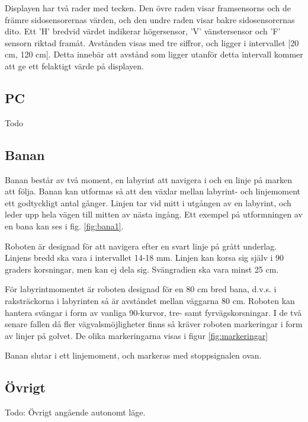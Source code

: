 
Displayen har två rader med tecken. Den övre raden visar framsensorns och de främre sidosensorernas värden, och den undre raden visar bakre sidosensorernas dito. Ett 'H' bredvid värdet indikerar högersensor, 'V' vänstersensor och 'F' sensorn riktad framåt. Avstånden visas med tre siffror, och ligger i intervallet [20 cm, 120 cm]. Detta innebär att avstånd som ligger utanför detta intervall kommer att ge ett felaktigt värde på displayen. 

\subsection{PC}
Todo

\subsection{Banan}
\label{sec:banan}

Banan består av två moment, en labyrint att navigera i och en linje på marken att följa. Banan kan utformas så att den växlar mellan labyrint- och linjemoment ett godtyckligt antal gånger. Linjen tar vid mitt i utgången av en labyrint, och leder upp hela vägen till mitten av nästa ingång. Ett exempel på utformningen av en bana kan ses i fig. \ref{fig:bana1}.


Roboten är designad för att navigera efter en svart linje på grått underlag. Linjens bredd ska vara i intervallet 14-18 mm. Linjen kan korsa sig själv i 90 graders korsningar, men kan ej dela sig. Svängradien ska vara minst 25 cm. 

För labyrintmomentet är roboten designad för en 80 cm bred bana, d.v.s. i raksträckorna i labyrinten så är avståndet mellan väggarna 80 cm. Roboten kan hantera svängar i form av vanliga 90\degree-kurvor, tre- samt fyrvägskorsningar. I de två senare fallen då fler vägvalsmöjligheter finns så kräver roboten markeringar i form av linjer på golvet. De olika markeringarna visas i figur \ref{fig:markeringar}


Banan slutar i ett linjemoment, och markeras med stoppsignalen ovan. 

\subsection{Övrigt}
Todo: Övrigt angående autonomt läge.








